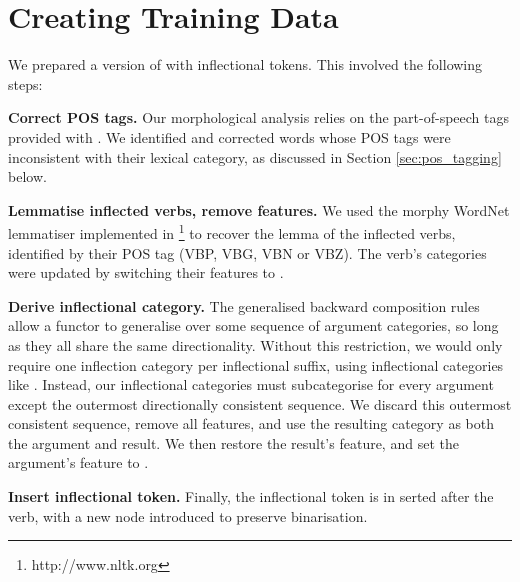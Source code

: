 \documentclass[11pt]{article}
\begin{document}
\section{Creating Training Data}

We prepared a version of \ccgbank \citep{hock:cl07} with
inflectional tokens. This involved the following steps:

\textbf{Correct POS tags.} Our morphological analysis relies on the
part-of-speech tags provided with \ccgbank. We identified and corrected
words whose POS tags were inconsistent with their lexical category,
as discussed in Section \ref{sec:pos_tagging} below.

\textbf{Lemmatise inflected verbs, remove features.} We used the morphy WordNet lemmatiser
implemented in \nltk\footnote{http://www.nltk.org} to recover the lemma of the
inflected verbs, identified by their POS tag (VBP, VBG, VBN or VBZ). The verb's categories
were updated by switching their features to .

\textbf{Derive inflectional category.} 
The generalised backward composition
rules allow a functor to generalise over some sequence of argument categories,
so long as they all share the same directionality.
Without this restriction, we would only require one inflection category per
inflectional suffix, using inflectional categories like .
Instead, our inflectional categories must subcategorise for every argument
except the outermost directionally consistent sequence.
We discard this outermost consistent sequence, remove all features, and use the
resulting category as both the argument and result. We then restore the result's feature,
and set the argument's feature to .

\textbf{Insert inflectional token.} Finally, the inflectional token is in
serted after the verb, with a new node introduced to preserve binarisation.
\end{document}
